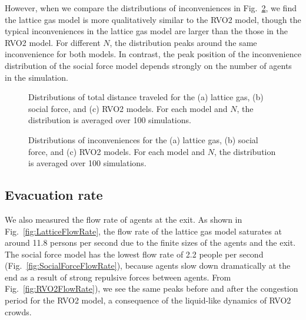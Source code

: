 However, when we compare the distributions of inconveniences in Fig.~\ref{fig:Incon}, we find the lattice gas model is more qualitatively similar to the RVO2 model, though the typical inconveniences in the lattice gas model are larger than the those in the RVO2 model. For different $N$, the distribution peaks around the same inconvenience for both models. In contrast, the peak position of the inconvenience distribution of the social force model depends strongly on the number of agents in the simulation.


\begin{figure}[htbp]
\caption{Distributions of total distance traveled for the (a) lattice gas, (b) social force, and (c) RVO2 models. For each model and $N$, the distribution is averaged over 100 simulations.}
\label{fig:TravelDist}
\end{figure}

\begin{figure}[htbp]
\caption{Distributions of inconveniences for the (a) lattice gas, (b) social force, and (c) RVO2 models. For each model and $N$, the distribution is averaged over 100 simulations.}
\label{fig:Incon}
\end{figure}



\subsection{Evacuation rate}

We also measured the flow rate of agents at the exit. As shown in Fig.~\ref{fig:LatticeFlowRate}, the flow rate of the lattice gas model saturates at around 11.8 persons per second due to the finite sizes of the agents and the exit. The social force model has the lowest flow rate of 2.2 people per second (Fig.~\ref{fig:SocialForceFlowRate}), because agents slow down dramatically at the end as a result of strong repulsive forces between agents. From Fig.~\ref{fig:RVO2FlowRate}), we see the same peaks before and after the congestion period for the RVO2 model, a consequence of the liquid-like dynamics of RVO2 crowds.

